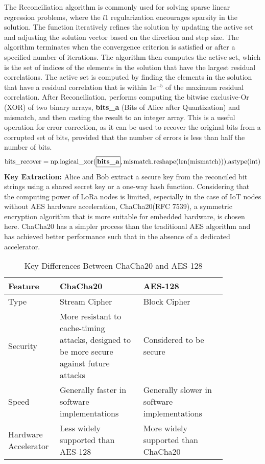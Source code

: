 The Reconciliation algorithm is commonly used for solving sparse linear regression problems, where the \(l1\) regularization encourages sparsity in the solution. The function iteratively refines the solution by updating the active set and adjusting the solution vector based on the direction and step size. The algorithm terminates when the convergence criterion is satisfied or after a specified number of iterations.
The algorithm then computes the active set, which is the set of indices of the elements in the solution that have the largest residual correlations. The active set is computed by finding the elements in the solution that have a residual correlation that is within \(1e^{-5}\) of the maximum residual correlation.
After Reconciliation, performs computing the bitwise exclusive-Or (XOR) of two binary arrays, \textbf{bits\_a} (Bits of Alice after Quantization) and mismatch, and then casting the result to an integer array. This is a useful operation for error correction, as it can be used to recover the original bits from a corrupted set of bits, provided that the number of errors is less than half the number of bits. 
  \[
  \text{{bits\_recover}} = \text{{np.logical\_xor}}(\textbf{\framebox[1.1\width]{{bits\_a}}}, \text{{mismatch}}.\text{{reshape}}(\text{{len}}(\text{{mismatch}}))).\text{{astype(int)}}
  \]
\textbf{Key Extraction:} Alice and Bob extract a secure key from the reconciled bit strings using a shared secret key or a one-way hash function. Considering that the computing power of LoRa nodes is limited, especially in the case of IoT nodes without AES hardware acceleration, ChaCha20(RFC 7539)\cite{rfc7539}, a symmetric encryption algorithm that is more suitable for embedded hardware, is chosen here. ChaCha20 has a simpler process than the traditional AES algorithm and has achieved better performance such that in the absence of a dedicated accelerator\cite{7507408,7927078}.
\begin{table}
    \centering
    \caption{Key Differences Between ChaCha20 and AES-128}
    \begin{tabular}{p{0.15\linewidth}p{0.35\linewidth}p{0.35\linewidth}}
      \toprule
      Feature&ChaCha20&AES-128\\
      \midrule
      Type&Stream Cipher&Block Cipher\\
      Security&More resistant to cache-timing attacks, designed to be more secure against future attacks&Considered to be secure\\
      Speed&Generally faster in software implementations&Generally slower in software implementations\\
      Hardware Accelerator&Less widely supported than AES-128&More widely supported than ChaCha20    \\
      \bottomrule
    \end{tabular}
    \label{tab:three-line}
\end{table}
